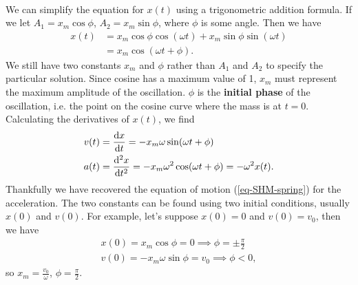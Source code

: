 \documentclass[../classical_mechanics.tex]{subfiles}
\begin{document}
        \paragraph{}
        We can simplify the equation for $x(t)$ using a trigonometric addition formula.
        If we let $A_1=x_m\cos\phi$, $A_2=x_m\sin\phi$, where $\phi$ is some angle.
        Then we have
        \begin{align}
            x(t)&=x_m\cos\phi\cos(\omega t)+x_m\sin\phi\sin(\omega t)\\
            &=x_m\cos(\omega t+\phi)\label{eq:SHM-displacement}.
        \end{align}
        We still have two constants $x_m$ and $\phi$ rather than $A_1$ and $A_2$ to specify the particular solution.
        Since cosine has a maximum value of 1, $x_m$ must represent the maximum amplitude of the oscillation.
        $\phi$ is the \textbf{initial phase} of the oscillation, i.e. the point on the cosine curve where the mass is at $t=0$.
        Calculating the derivatives of $x(t)$, we find
        \begin{align}
            v(t)&=\dv{x}{t}=-x_m\omega\sin(\omega t+\phi)\label{eq:SHM-velocity}\\
            a(t)&=\dv[2]{x}{t}=-x_m\omega^2\cos(\omega t+\phi)=-\omega^2x(t)\label{eq:SHM-acceleration}.
        \end{align}
        Thankfully we have recovered the equation of motion (\ref{eq-SHM-spring}) for the acceleration.
        The two constants can be found using two initial conditions, usually $x(0)$ and $v(0)$.
        For example, let's suppose $x(0)=0$ and $v(0)=v_0$, then we have
        \begin{align}
            x(0)=x_m\cos\phi=0\implies\phi=\pm\frac{\pi}{2}\\
            v(0)=-x_m\omega\sin\phi=v_0\implies\phi<0,
        \end{align}
        so $x_m=\frac{v_0}{\omega}$, $\phi=\frac{\pi}{2}$.
\end{document}
